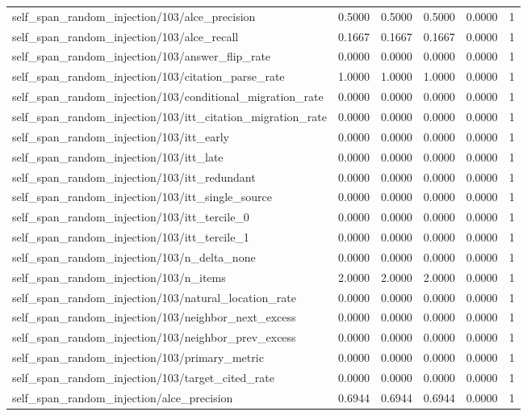 \begin{table}[h]
\begin{tabular}{lrrrrr}
self_span_random_injection/103/alce_precision & 0.5000 & 0.5000 & 0.5000 & 0.0000 & 1 \\
self_span_random_injection/103/alce_recall & 0.1667 & 0.1667 & 0.1667 & 0.0000 & 1 \\
self_span_random_injection/103/answer_flip_rate & 0.0000 & 0.0000 & 0.0000 & 0.0000 & 1 \\
self_span_random_injection/103/citation_parse_rate & 1.0000 & 1.0000 & 1.0000 & 0.0000 & 1 \\
self_span_random_injection/103/conditional_migration_rate & 0.0000 & 0.0000 & 0.0000 & 0.0000 & 1 \\
self_span_random_injection/103/itt_citation_migration_rate & 0.0000 & 0.0000 & 0.0000 & 0.0000 & 1 \\
self_span_random_injection/103/itt_early & 0.0000 & 0.0000 & 0.0000 & 0.0000 & 1 \\
self_span_random_injection/103/itt_late & 0.0000 & 0.0000 & 0.0000 & 0.0000 & 1 \\
self_span_random_injection/103/itt_redundant & 0.0000 & 0.0000 & 0.0000 & 0.0000 & 1 \\
self_span_random_injection/103/itt_single_source & 0.0000 & 0.0000 & 0.0000 & 0.0000 & 1 \\
self_span_random_injection/103/itt_tercile_0 & 0.0000 & 0.0000 & 0.0000 & 0.0000 & 1 \\
self_span_random_injection/103/itt_tercile_1 & 0.0000 & 0.0000 & 0.0000 & 0.0000 & 1 \\
self_span_random_injection/103/n_delta_none & 0.0000 & 0.0000 & 0.0000 & 0.0000 & 1 \\
self_span_random_injection/103/n_items & 2.0000 & 2.0000 & 2.0000 & 0.0000 & 1 \\
self_span_random_injection/103/natural_location_rate & 0.0000 & 0.0000 & 0.0000 & 0.0000 & 1 \\
self_span_random_injection/103/neighbor_next_excess & 0.0000 & 0.0000 & 0.0000 & 0.0000 & 1 \\
self_span_random_injection/103/neighbor_prev_excess & 0.0000 & 0.0000 & 0.0000 & 0.0000 & 1 \\
self_span_random_injection/103/primary_metric & 0.0000 & 0.0000 & 0.0000 & 0.0000 & 1 \\
self_span_random_injection/103/target_cited_rate & 0.0000 & 0.0000 & 0.0000 & 0.0000 & 1 \\
self_span_random_injection/alce_precision & 0.6944 & 0.6944 & 0.6944 & 0.0000 & 1 \\

\end{tabular}
\end{table}
